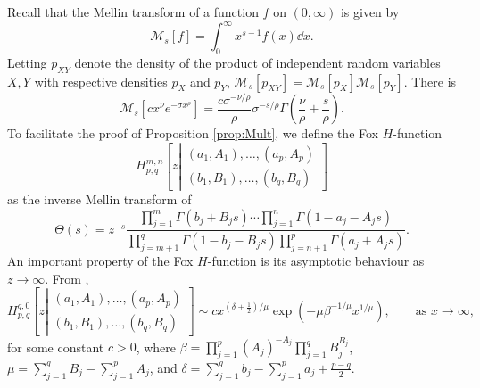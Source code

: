 \documentclass[../thesis.tex]{subfiles}
\begin{document}
Recall that the Mellin transform of a function $f$ on $(0,\infty)$ is given by
\[
  \mathcal{M}_s[f] = \int_0^\infty x^{s-1} f(x) \dd x.
\]
Letting $p_{XY}$ denote the density of the product of independent random variables $X,Y$ with respective densities $p_X$ and $p_Y$, $\mathcal{M}_s[p_{XY}] = \mathcal{M}_s[p_X] \mathcal{M}_s[p_Y]$. There is
\[
  \mathcal{M}_s[c x^\nu e^{-\sigma x^\rho}] = \frac{c \sigma^{-\nu/\rho}}{\rho} \sigma^{-s/\rho} \Gamma\left(\frac{\nu}{\rho} + \frac{s}{\rho}\right).
\]
To facilitate the proof of Proposition \ref{prop:Mult}, we define the Fox $H$-function
\[
  H_{p,q}^{m,n}\left[z\left|\substack{(a_{1},A_{1}),\dots,(a_{p},A_{p})\\
  (b_{1},B_{1}),\dots,(b_{q},B_{q})
  }
  \right.\right]
\]
as the inverse Mellin transform of
\[
  \Theta(s) = z^{-s} \frac{\prod_{j=1}^m \Gamma(b_j + B_j s) \cdots \prod_{j=1}^n \Gamma(1-a_j - A_j s)}{\prod_{j=m+1}^q \Gamma(1-b_j - B_j s) \prod_{j=n+1}^p \Gamma(a_j + A_j s)}.
\]
An important property of the Fox $H$-function is its asymptotic behaviour as $z \to \infty$. From \cite[Theorem 1.3]{mathai2009h},
\[
  H_{p,q}^{q,0}\left[z\left|\substack{(a_{1},A_{1}),\dots,(a_{p},A_{p})\\
  (b_{1},B_{1}),\dots,(b_{q},B_{q})}\right.\right] \sim c x^{(\delta+\frac12)/\mu} \exp(-\mu \beta^{-1/\mu} x^{1/\mu}),\qquad \mbox{as }x\to\infty,
\]
for some constant $c > 0$, where $\beta = \prod_{j=1}^p (A_j)^{-A_j} \prod_{j=1}^q B_j^{B_j}$, $\mu = \sum_{j=1}^q B_j - \sum_{j=1}^p A_j$, and $\delta = \sum_{j=1}^q b_j - \sum_{j=1}^p a_j + \frac{p-q}{2}$.
\end{document}
